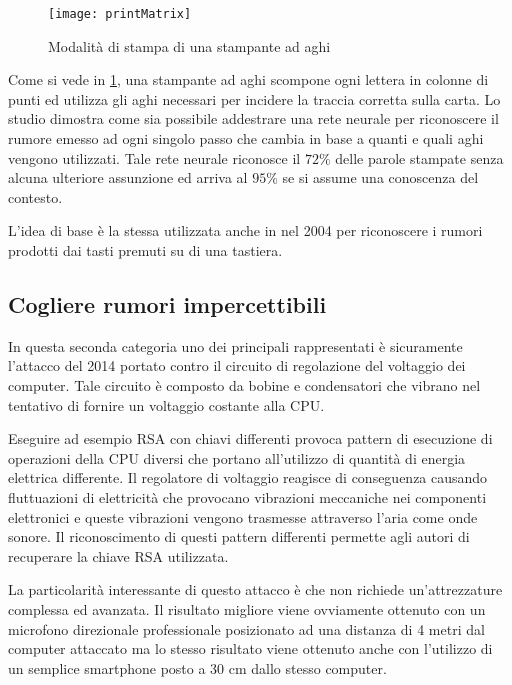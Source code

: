 			\begin{figure}
				\begin{center}
					\texttt{[image: printMatrix]}
					\caption{Modalità di stampa di una stampante ad aghi}
					\label{fig:matrixHead}
				\end{center}
			\end{figure}
			
			Come si vede in \cref{fig:matrixHead}, una stampante ad aghi scompone ogni lettera in colonne di punti ed utilizza gli aghi necessari per incidere la traccia corretta sulla carta. Lo studio dimostra come sia possibile addestrare una rete neurale per riconoscere il rumore emesso ad ogni singolo passo che cambia in base a quanti e quali aghi vengono utilizzati. Tale rete neurale riconosce il $72\%$ delle parole stampate senza alcuna ulteriore assunzione ed arriva al $95\%$ se si assume una conoscenza del contesto.
			
			L'idea di base è la stessa utilizzata anche in \cite{asonov2004keyboard} nel 2004 per riconoscere i rumori prodotti dai tasti premuti su di una tastiera.
		
		\subsection{Cogliere rumori impercettibili}	
			In questa seconda categoria uno dei principali rappresentati è sicuramente l'attacco\cite{genkin2014rsa} del 2014 portato contro il circuito di regolazione del voltaggio dei computer. Tale circuito è composto da bobine e condensatori che vibrano nel tentativo di fornire un voltaggio costante alla CPU.
			
			Eseguire ad esempio RSA con chiavi differenti provoca pattern di esecuzione di operazioni della CPU diversi che portano all'utilizzo di quantità di energia elettrica differente. Il regolatore di voltaggio reagisce di conseguenza causando fluttuazioni di elettricità che provocano vibrazioni meccaniche nei componenti elettronici e queste vibrazioni vengono trasmesse attraverso l'aria come onde sonore. Il riconoscimento di questi pattern differenti permette agli autori di recuperare la chiave RSA utilizzata.
			
			La particolarità interessante di questo attacco è che non richiede un'attrezzature complessa ed avanzata. Il risultato migliore viene ovviamente ottenuto con un microfono direzionale professionale posizionato ad una distanza di 4 metri dal computer attaccato ma lo stesso risultato viene ottenuto anche con l'utilizzo di un semplice smartphone posto a 30 cm dallo stesso computer.
			
